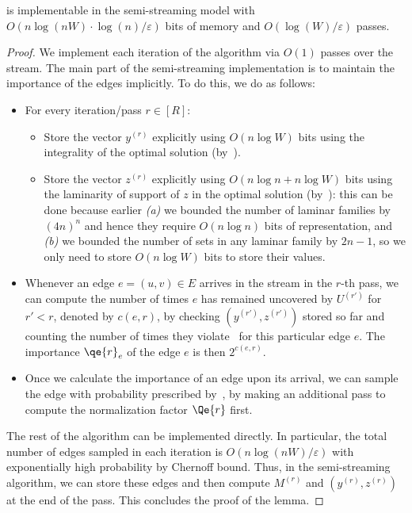 \documentclass{article}
\newcommand{\eps}{\varepsilon}
\begin{document}
\begin{lemma}\label{lem:semi-stream-general}
	 is implementable in the semi-streaming model with $\!O(n \log(nW) \cdot \log{\!(n)}/\eps)$ bits of memory and $O(\log{\!(W)}/\eps)$ passes. 
\end{lemma}
\begin{proof}
	

	We implement each iteration of the algorithm via $O(1)$ passes over the stream. The main part of the semi-streaming implementation is to maintain the importance of the edges implicitly. To do this, we do as follows: 
	\begin{itemize}[leftmargin=10pt]
	\item For every iteration/pass $r \in [R]$: 
	\begin{itemize}
		\item Store the vector $y^{(r)}$ explicitly using $O(n\log{W})$ bits using the integrality of the optimal solution (by~). 
		\item Store the vector $z^{(r)}$ explicitly using $O(n\log{n} + n\log{W})$ bits using the laminarity of support of $z$ in the optimal solution (by~): this can be done
		because earlier \emph{(a)} we bounded the number of laminar families by $(4n)^n$ and hence they require $O(n\log{n})$ bits of representation, and \emph{(b)} we bounded the number of sets in any laminar family
		by $2n-1$, so we only need to store $O(n\log{W})$ bits to store their values. 
	\end{itemize}
	\item Whenever an edge $e=(u,v) \in E$ arrives in the stream in the $r$-th pass, we can compute the number of times $e$ has remained uncovered by $U^{(r')}$ for $r' < r$, denoted by $c(e,r)$, by checking $(y^{(r')},z^{(r')})$ stored
	so far and counting the number of times they violate~ for this particular edge $e$. The importance $\qe{r}_e$ of the edge $e$ is then $2^{c(e,r)}$. 
	\item Once we calculate the importance of an edge upon its arrival, we can sample the edge with probability prescribed by~, by making an additional pass to compute the normalization factor $\Qe{r}$ first. 
	\end{itemize} 
	
	The rest of the algorithm can be implemented directly. In particular, the total number of edges sampled in each iteration is $O(n\log\!{(nW)}/\eps)$ with exponentially high probability by Chernoff bound. Thus, in the semi-streaming algorithm, 
	we can store these edges and then compute $M^{(r)}$ and $(y^{(r)},z^{(r)})$ at the end of the pass. This concludes the proof of the lemma. 
\end{proof}
\end{document}
